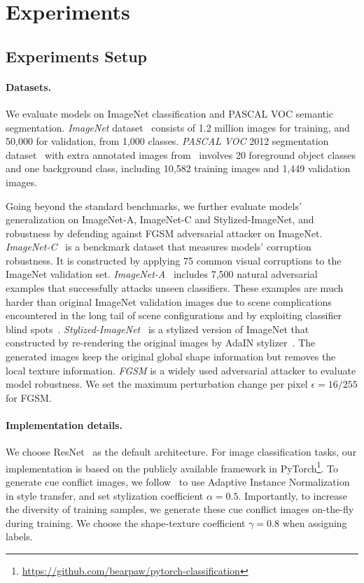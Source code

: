 \documentclass{article} \usepackage{iclr2021_conference,times}
\begin{document}
\section{Experiments}\label{sec:exp}

\subsection{Experiments Setup}
\label{sec:setup}
\paragraph{Datasets.} 
We evaluate models on ImageNet classification and PASCAL VOC semantic segmentation. \emph{ImageNet} dataset~\citep{ILSVRC15} consists of 1.2 million images for training, and 50,000 for validation, from 1,000 classes.  \emph{PASCAL VOC} 2012 segmentation dataset~\citep{pascal-voc-2012} with extra annotated images from~\citep{BharathICCV2011} involves 20 foreground object classes and one background class, including 10,582 training images and 1,449 validation images. 

Going beyond the standard benchmarks, we further evaluate models' generalization on ImageNet-A, ImageNet-C and Stylized-ImageNet, and robustness by defending against FGSM adversarial attacker on ImageNet. \emph{ImageNet-C}~\citep{hendrycks2018benchmarking} is a benckmark dataset that measures models' corruption robustness. It is constructed by applying 75 common visual corruptions to the ImageNet validation set. \emph{ImageNet-A}~\citep{hendrycks2019nae} includes 7,500 natural adversarial examples that successfully attacks unseen classifiers. These examples are much harder than original ImageNet validation images due to scene complications encountered in the long tail of scene configurations and by exploiting classifier blind spots~\citep{hendrycks2019nae}. \emph{Stylized-ImageNet}~\citep{geirhos2018imagenettrained} is a stylized version of ImageNet that constructed by re-rendering the original images by AdaIN stylizer~\citep{huang2017arbitrary}. The generated images keep the original global shape information but removes the local texture information.
\emph{FGSM} \citep{explaining2015goodfellow} is a widely used adversarial attacker to evaluate model robustness.
We set the maximum perturbation change per pixel $\epsilon = 16/255$ for FGSM. 

\paragraph{Implementation details.} We choose ResNet~\citep{he2016deep} as the default architecture. For image classification tasks, our implementation is based on the publicly available framework in PyTorch\footnote{\url{https://github.com/bearpaw/pytorch-classification}}. 
To generate cue conflict images, we follow~\citet{geirhos2018imagenettrained} to use Adaptive Instance Normalization~\citep{huang2017arbitrary} in style transfer, and set stylization coefficient $\alpha = 0.5$. Importantly, to increase the diversity of training samples, we generate these cue conflict images on-the-fly during training. We choose the shape-texture coefficient $\gamma = 0.8$ when assigning labels.  
\end{document}
